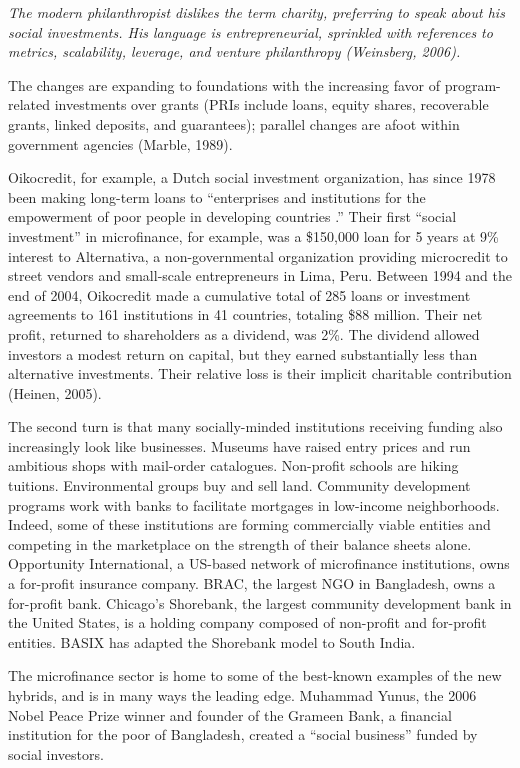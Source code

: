 \documentclass{article} %
\begin{document}
\noindent \textit{The modern philanthropist dislikes the term charity, preferring to speak about his social investments. His language is entrepreneurial, sprinkled with references to metrics, scalability, leverage, and venture philanthropy (Weinsberg, 2006).  }

The changes are expanding to foundations with the increasing favor of program-related investments over grants (PRIs include loans, equity shares, recoverable grants, linked deposits, and guarantees); parallel changes are afoot within government agencies (Marble, 1989). 

Oikocredit, for example, a Dutch social investment organization, has since 1978 been making long-term loans to ``enterprises and institutions for the empowerment of poor people in developing countries .'' Their first ``social investment'' in microfinance, for example, was a \$150,000 loan for 5 years at 9\% interest to Alternativa, a non-governmental organization providing microcredit to street vendors and small-scale entrepreneurs in Lima, Peru. Between 1994 and the end of 2004, Oikocredit made a cumulative total of 285 loans or investment agreements to 161 institutions in 41 countries, totaling \$88 million. Their net profit, returned to shareholders as a dividend, was 2\%. The dividend allowed investors a modest return on capital, but they earned substantially less than alternative investments. Their relative loss is their implicit charitable contribution (Heinen, 2005). 

The second turn is that many socially-minded institutions receiving funding also increasingly look like businesses. Museums have raised entry prices and run ambitious shops with mail-order catalogues. Non-profit schools are hiking tuitions.  Environmental groups buy and sell land. Community development programs work with banks to facilitate mortgages in low-income neighborhoods. Indeed, some of these institutions are forming commercially viable entities and competing in the marketplace on the strength of their balance sheets alone. Opportunity International, a US-based network of microfinance institutions, owns a for-profit insurance company. BRAC, the largest NGO in Bangladesh, owns a for-profit bank. Chicago's Shorebank, the largest community development bank in the United States, is a holding company composed of non-profit and for-profit entities. BASIX has adapted the Shorebank model to South India. 

The microfinance sector is home to some of the best-known examples of the new hybrids, and is in many ways the leading edge. Muhammad Yunus, the 2006 Nobel Peace Prize winner and founder of the Grameen Bank, a financial institution for the poor of Bangladesh, created a ``social business'' funded by social investors. 
\end{document}
